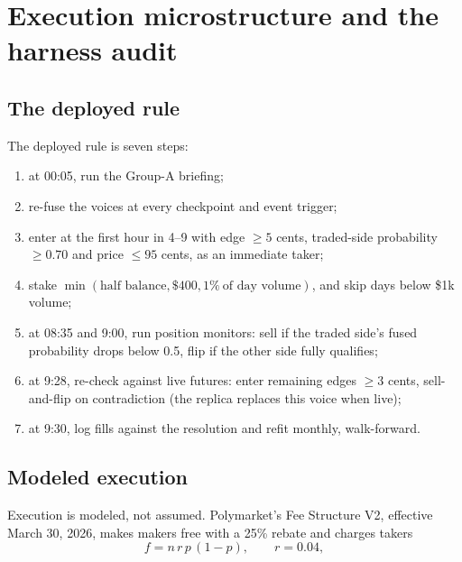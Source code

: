 \section{Execution microstructure and the harness audit}
\label{app:execution}

\subsection{The deployed rule}
\label{app:execution_rule}

The deployed rule is seven steps:
\begin{enumerate}
  \item at 00:05, run the Group-A briefing;
  \item re-fuse the voices at every checkpoint and event trigger;
  \item enter at the first hour in 4--9 with edge $\ge 5$ cents,
    traded-side probability $\ge 0.70$ and price $\le 95$ cents, as an
    immediate taker;
  \item stake $\min(\mbox{half balance}, \$400, 1\%\ \mbox{of day
    volume})$, and skip days below \$1k volume;
  \item at 08:35 and 9:00, run position monitors: sell if the traded
    side's fused probability drops below 0.5, flip if the other side
    fully qualifies;
  \item at 9:28, re-check against live futures: enter remaining edges
    $\ge 3$ cents, sell-and-flip on contradiction (the replica replaces
    this voice when live);
  \item at 9:30, log fills against the resolution and refit monthly,
    walk-forward.
\end{enumerate}

\subsection{Modeled execution}
\label{app:execution_model}

Execution is modeled, not assumed. Polymarket's Fee Structure V2,
effective March 30, 2026, makes makers free with a 25\% rebate and charges
takers
\begin{equation}
f = n \, r \, p\,(1-p), \qquad r = 0.04,
\label{eq:takerfee}
\end{equation}

